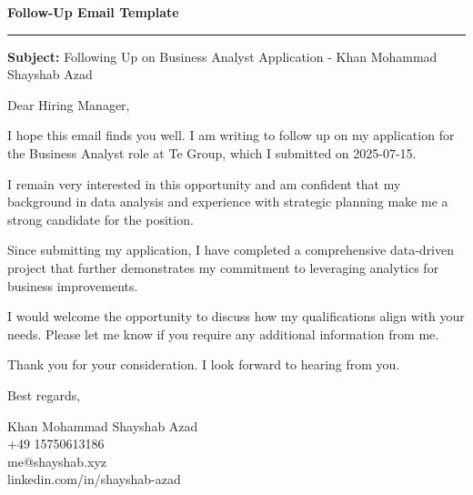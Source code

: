 \documentclass[11pt,a4paper]{article}
\begin{document}
\begin{center}
\textbf{\Large Follow-Up Email Template}
\end{center}
\vspace{1em}
{\color{accentColor}\rule{\textwidth}{1pt}}
\vspace{1em}

\textbf{Subject:} Following Up on Business Analyst Application - Khan Mohammad Shayshab Azad

\vspace{1em}

Dear Hiring Manager,

I hope this email finds you well. I am writing to follow up on my application for the Business Analyst role at Te Group, which I submitted on 2025-07-15.

I remain very interested in this opportunity and am confident that my background in data analysis and experience with strategic planning make me a strong candidate for the position.

Since submitting my application, I have completed a comprehensive data-driven project that further demonstrates my commitment to leveraging analytics for business improvements.

I would welcome the opportunity to discuss how my qualifications align with your needs. Please let me know if you require any additional information from me.

Thank you for your consideration. I look forward to hearing from you.

\vspace{1em}

Best regards,

\vspace{1em}

Khan Mohammad Shayshab Azad\\
+49 15750613186\\
me@shayshab.xyz\\
linkedin.com/in/shayshab-azad
\end{document}
